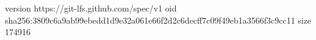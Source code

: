 version https://git-lfs.github.com/spec/v1
oid sha256:3809c6a9ab99ebedd1d9e32a061e66f2d2c6decff7c09f49eb1a3566f3c9cc11
size 174916
